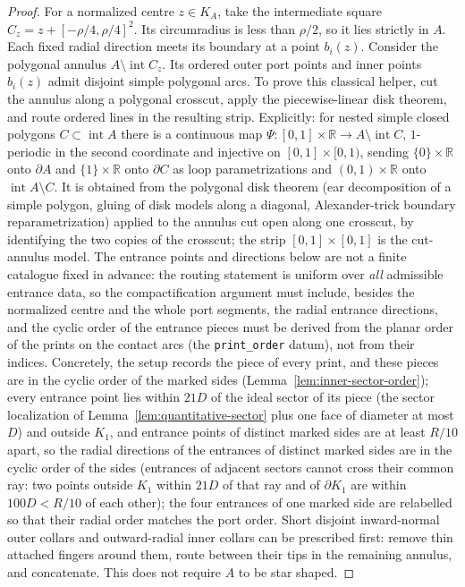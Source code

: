 \begin{proof}
For a normalized centre $z\in K_A$, take the intermediate square
$C_z=z+[-\rho/4,\rho/4]^2$.  Its circumradius is less than $\rho/2$,
so it lies strictly in $A$.  Each fixed radial direction meets its
boundary at a point $b_i(z)$.  Consider the polygonal annulus
$A\setminus\operatorname{int}C_z$.  Its ordered outer port points and
inner points $b_i(z)$ admit disjoint simple polygonal arcs.  To prove this
classical helper, cut the annulus along a polygonal crosscut, apply the
piecewise-linear disk theorem, and route ordered lines in the resulting
strip.  Explicitly: for nested simple closed polygons $C\subset\operatorname{int}A$
there is a continuous map $\Psi\colon[0,1]\times\mathbb R\to A\setminus\operatorname{int}C$,
$1$-periodic in the second coordinate and injective on $[0,1]\times[0,1)$,
sending $\{0\}\times\mathbb R$ onto $\partial A$ and $\{1\}\times\mathbb R$ onto
$\partial C$ as loop parametrizations and $(0,1)\times\mathbb R$ onto
$\operatorname{int}A\setminus C$.  It is obtained from the polygonal disk
theorem (ear decomposition of a simple polygon, gluing of disk models along
a diagonal, Alexander-trick boundary reparametrization) applied to the
annulus cut open along one crosscut, by identifying the two copies of the
crosscut; the strip $[0,1]\times[0,1]$ is the cut-annulus model.  The
entrance points and directions below are not a finite catalogue fixed in
advance: the routing statement is uniform over \emph{all} admissible
entrance data, so the compactification argument must include, besides the
normalized centre and the whole port segments, the radial entrance
directions, and the cyclic order of the entrance pieces must be derived
from the planar order of the prints on the contact arcs (the
\texttt{print\_order} datum), not from their indices.  Concretely, the
setup records the piece of every print, and these pieces are in the cyclic
order of the marked sides (Lemma~\ref{lem:inner-sector-order}); every
entrance point lies within $21D$ of the ideal sector of its piece (the
sector localization of Lemma~\ref{lem:quantitative-sector} plus one face of
diameter at most $D$) and outside $K_1$, and entrance points of distinct
marked sides are at least $R/10$ apart, so the radial directions of the
entrances of distinct marked sides are in the cyclic order of the sides
(entrances of adjacent sectors cannot cross their common ray: two points
outside $K_1$ within $21D$ of that ray and of $\partial K_1$ are within
$100D<R/10$ of each other); the four entrances of one marked side are
relabelled so that their radial order matches the port order.  Short disjoint inward-normal outer collars and outward-radial
inner collars can be prescribed first: remove thin attached fingers
around them, route between their tips in the remaining annulus, and
concatenate.  This does not require $A$ to be star shaped.


\end{proof}
